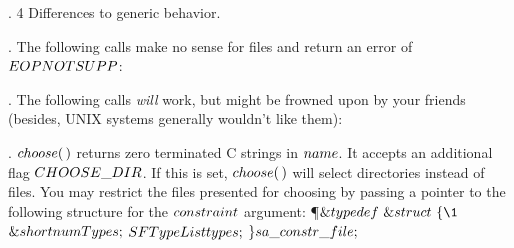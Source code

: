 . 4 Differences to generic behavior.

\fi

. The following calls make no sense for files and return an error of \CD{}$%
\\{EOPNOTSUPP}$\DC{}:
\medskip{}

\fi

. The following calls {\it will} work, but might be frowned upon by your
friends
(besides, UNIX systems generally wouldn't like them):
\medskip{}

\fi

. \CD{}$\\{choose}(\,)$\DC{} returns zero terminated C strings in \CD{}$%
\\{name}$\DC{}.
It accepts an additional flag \CD{}$\\{CHOOSE\_DIR}$\DC{}. If this is set, %
\CD{}$\\{choose}(\,)$\DC{}
will select directories instead of files.
\medskip You may restrict the files presented for choosing by passing a pointer
to
the following structure for the \CD{}$\\{constraint}$\DC{} argument:
\Y\P $\&{typedef}\ \&{struct}\ \{\1$\6
$\&{short}\ \\{numTypes};$\5
\6
$\\{SFTypeList}\ \\{types};$\5
\2\6
$\}\ \\{sa\_constr\_file};$\par
\fi

